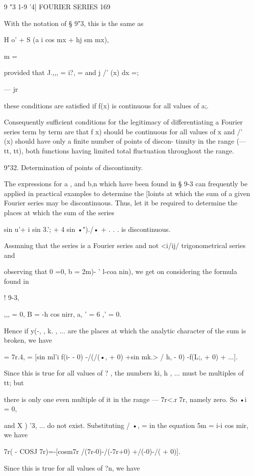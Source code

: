 9 "3 1-9 '4] FOURIER SERIES 169

With the notation of § 9"3, this is the same as

H o' + S (a i cos mx + hj sm mx),

  m = \

provided that J.,,, = i?, = and j /' (x) dx =;

— jr

these conditions are satisfied if f(x) is continuous for all values of
a;.

Consequently sufficient conditions for the legitimacy of
differentiating a Fourier series term by term are that f x) should be
continuous for all values of x and /' (x) should have only a finite
number of points of discon- tinuity in the range (— tt, tt), both
functions having limited total fluctuation throughout the range.

9"32. Determination of points of discontinuity.

The expressions for a , and b,n which have been found in § 9-3 can
frequently be applied in practical examples to determine the [loints
at which the sum of a given Fourier series may be discontinuous. Thus,
let it be required to determine the places at which the sum of the
series

sin u'+ i sin 3.'; + 4 sin •")./• + . . . is discontinuous.

  Assmning that the series is a Fourier series and not <i/ij/
trigonometrical series and

observing that 0 =0, b = 2m)- ' l-coa nin), we get on considering the
formula found in

! 9-3,

 ,,, = 0, B = -h cos nirr, a, ' = 6 ,' = 0.

Hence if y(-, , k. , ... are the places at which the analytic
character of the sum is broken, we have

= 7r.4, = [sin ml'i f(i- - 0) -/(/(•, + 0) +sin mk.> / h, - 0) -f(L;,
+ 0) + ...].

Since this is true for all values of ? , the numbers ki, h , ... must
be multiples of tt; but

there is only one even multiple of it in the range — 7r<.r 7r, namely
zero. So •i = 0,

and X ) '3, ... do not exist. Substituting / •, = in the equation 5m =
i-i cos mir, we have

7r( - COSJ 7r)=-[cosm7r /(7r-0)-/(-7r+0) +/(-0)-/( + 0)].

Since this is true for all values of ?n, we have

